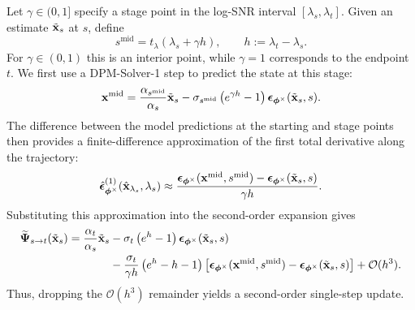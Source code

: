 Let $\gamma\in(0,1]$ specify a stage point in the log-SNR interval
$[\lambda_s,\lambda_t]$. Given an estimate $\tilde{{\mathbf{x}}}_s$ at $s$, define
\[
s^{\mathrm{mid}}
=
t_\lambda\left(\lambda_s+\gamma h\right),
\qquad
h:=\lambda_t-\lambda_s.
\]
For $\gamma\in(0,1)$ this is an interior point, while $\gamma=1$ corresponds
to the endpoint $t$. We first use a DPM-Solver-1 step to predict the state at
this stage:
\[
{\mathbf{x}}^{\mathrm{mid}}
=
\frac{\alpha_{s^{\mathrm{mid}}}}{\alpha_s}\tilde{{\mathbf{x}}}_s
-
\sigma_{s^{\mathrm{mid}}}
\left(e^{\gamma h}-1\right)
\bm{\epsilon}_{\bm{\phi}^\times}(\tilde{{\mathbf{x}}}_s,s).
\]
The difference between the model predictions at the starting and stage points
then provides a finite-difference approximation of the first total derivative
along the trajectory:
\[
\hat{\bm{\epsilon}}_{\bm{\phi}^\times}^{(1)}
(\hat{{\mathbf{x}}}_{\lambda_s},\lambda_s)
\approx
\frac{
\bm{\epsilon}_{\bm{\phi}^\times}
({\mathbf{x}}^{\mathrm{mid}},s^{\mathrm{mid}})
-
\bm{\epsilon}_{\bm{\phi}^\times}
(\tilde{{\mathbf{x}}}_s,s)
}{
\gamma h
}.
\]
Substituting this approximation into the second-order expansion gives
\begin{align}
\label{eq:dpm-solver-2-app}
\begin{aligned}
\widetilde{{\bm{\Psi}}}_{s\to t}(\tilde{{\mathbf{x}}}_s)
=
\frac{\alpha_t}{\alpha_s}\tilde{{\mathbf{x}}}_s
&-
\sigma_t
\left(e^h-1\right)
\bm{\epsilon}_{\bm{\phi}^\times}(\tilde{{\mathbf{x}}}_s,s)
\\
&-
\frac{\sigma_t}{\gamma h}
\left(e^h-h-1\right)
\left[
\bm{\epsilon}_{\bm{\phi}^\times}
({\mathbf{x}}^{\mathrm{mid}},s^{\mathrm{mid}})
-
\bm{\epsilon}_{\bm{\phi}^\times}
(\tilde{{\mathbf{x}}}_s,s)
\right]
+
\mathcal O(h^3).
\end{aligned}
\end{align}
Thus, dropping the $\mathcal O(h^3)$ remainder yields a second-order
single-step update.

